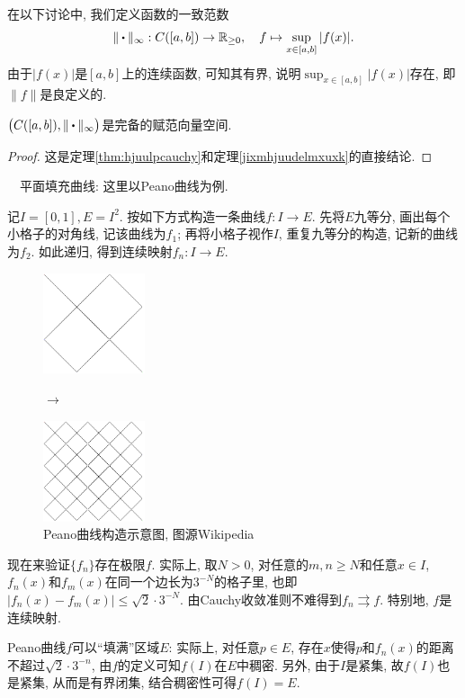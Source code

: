 在以下讨论中, 我们定义函数的一致范数$$\| \bigcdot \|_{\infty} : C([a,b]) \to \R _{\geq 0}, \quad f \mapsto \sup_{x \in [a,b]}|f(x)|. $$
由于$|f(x)|$是$[a,b]$上的连续函数, 可知其有界, 说明$\sup_{x \in [a,b]}|f(x)|$存在, 即$\| f \|$是良定义的. 

\begin{theorem}{}
	$\big( C([a,b]),\| \bigcdot \|_{\infty} \big)$是完备的赋范向量空间. 
\end{theorem}
\begin{proof}
	这是定理\ref{thm:hjuulpcauchy}和定理\ref{jixmhjuudelmxuxk}的直接结论. 
\end{proof}

~~平面填充曲线: 这里以Peano曲线为例. 

记$I=[0,1],E=I^2$. 按如下方式构造一条曲线$f:I \to E$. 先将$E$九等分, 画出每个小格子的对角线, 记该曲线为$f_1$; 再将小格子视作$I$, 重复九等分的构造, 记新的曲线为$f_2$. 如此递归, 得到连续映射$f_n:I \to E$. 

\begin{figure}[H]
	\centering
	\begin{minipage}[t]{0.3\textwidth}
		\centering
		\includegraphics[width=3cm]{attachment/Peano_1.png}
	\end{minipage}
	$\longrightarrow$
	\begin{minipage}[t]{0.3\textwidth}
		\centering
		\includegraphics[width=3cm]{attachment/Peano_2.png}
	\end{minipage}
	\caption{Peano曲线构造示意图, 图源Wikipedia}
\end{figure}

现在来验证$\{ f_n \}$存在极限$f$. 实际上, 取$N>0$, 对任意的$m,n \geq N$和任意$x \in I$, $f_n(x)$和$f_m(x)$在同一个边长为$3^{-N}$的格子里, 也即$|f_n(x)-f_m(x)| \leq \sqrt{2} \cdot 3^{-N}$. 由Cauchy收敛准则不难得到$f_n \rightrightarrows f$. 特别地, $f$是连续映射. 

Peano曲线$f$可以“填满”区域$E$: 实际上, 对任意$p \in E$, 存在$x$使得$p$和$f_n(x)$的距离不超过$\sqrt{2} \cdot 3^{-n}$, 由$f$的定义可知$f(I)$在$E$中稠密. 另外, 由于$I$是紧集, 故$f(I)$也是紧集, 从而是有界闭集, 结合稠密性可得$f(I)=E$. 

























